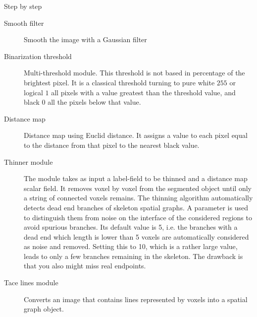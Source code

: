 Step by step
 \begin{description}
 \item[Smooth filter] Smooth the image with a Gaussian filter
 \item[Binarization threshold] Multi-threshold module. This threshold is not
 based in percentage of the brightest pixel. It is a classical threshold turning
 to pure white $255$ or logical $1$ all pixels with a value greatest than the
 threshold value, and black $0$ all the pixels below that value.
 \item[Distance map] Distance map using Euclid distance. It assigns a value
 to each pixel equal to the distance from that pixel to the nearest black value. 
 \item[Thinner module] The module takes as input a label-field to be thinned and
 a distance map scalar field. It removes voxel by voxel from the segmented
 object until only a string of connected voxels remains.
 The thinning algorithm automatically detects dead end branches of skeleton
 spatial graphs. A parameter is used to distinguish them from noise on the
 interface  of the considered regions to avoid spurious branches.  Its default
 value is 5, i.e. the branches with a dead end which length is lower  than 5
 voxels are automatically considered as noise and removed.  Setting this to 10,
 which is a rather large value, leads to only a few branches remaining in the
 skeleton.  The drawback is that you also might miss real endpoints.
 
\item[Tace lines module] Converts an image that contains lines represented by
voxels into a spatial graph object.

 \end{description}

